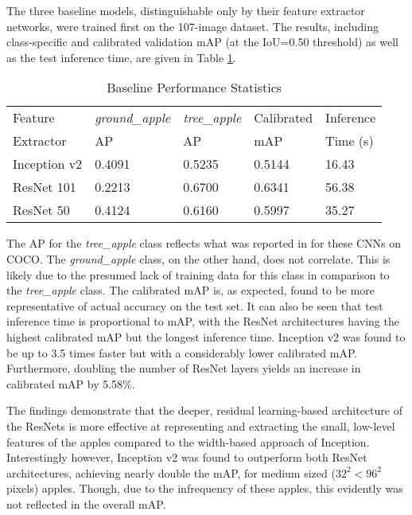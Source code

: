 \documentclass[journal]{IEEEtran}
\begin{document}
The three baseline models, distinguishable only by their feature extractor networks, were trained first on the 107-image dataset. The results, including class-specific and calibrated validation mAP (at the IoU=0.50 threshold) as well as the test inference time, are given in Table \ref{tab:baseline_results}.   

\begin{table}[H]
\begin{center}
\caption{Baseline Performance Statistics}\label{tab:baseline_results}
\begin{tabular}{lllll}
\hline \hline
Feature & \textit{ground\_apple} & \textit{tree\_apple} & Calibrated & Inference\\
Extractor & AP & AP & mAP & Time (s)\\
\hline \hline
Inception v2 & 0.4091 & 0.5235 & 0.5144 & 16.43 \\
ResNet 101 & 0.2213 & 0.6700 & 0.6341 & 56.38 \\
ResNet 50 & 0.4124 & 0.6160 & 0.5997 & 35.27 \\
\hline \hline
\end{tabular}
\end{center}
\end{table}


The AP for the \textit{tree\_apple} class reflects what was reported in \cite{modelzoo} for these CNNs on COCO. The \textit{ground\_apple} class, on the other hand, does not correlate. This is likely due to the presumed lack of training data for this class in comparison to the \textit{tree\_apple} class. The calibrated mAP is, as expected, found to be more representative of actual accuracy on the test set. It can also be seen that test inference time is proportional to mAP, with the ResNet architectures having the highest calibrated mAP but the longest inference time. Inception v2 was found to be up to 3.5 times faster but with a considerably lower calibrated mAP. Furthermore, doubling the number of ResNet layers yields an increase in calibrated mAP by 5.58\%.

The findings demonstrate that the deeper, residual learning-based architecture of the ResNets is more effective at representing and extracting the small, low-level features of the apples compared to the width-based approach of Inception. Interestingly however, Inception v2 was found to outperform both ResNet architectures, achieving nearly double the mAP, for medium sized ($32^2<96^2$ pixels) apples. Though, due to the infrequency of these apples, this evidently was not reflected in the overall mAP.
\end{document}
